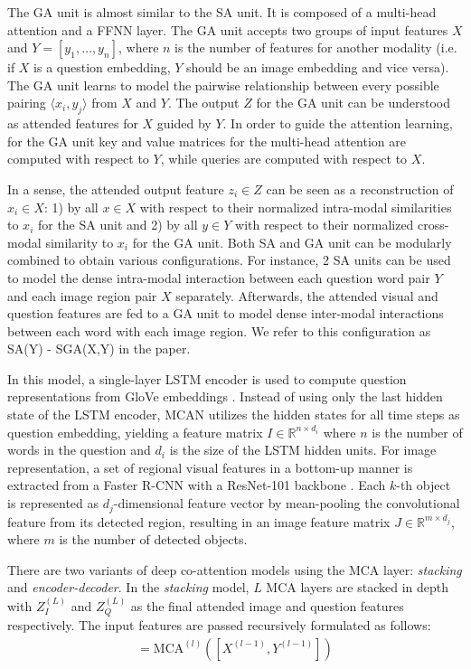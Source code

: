 \documentclass{article}
\begin{document}
The GA unit is almost similar to the SA unit. It is composed of a multi-head attention and a FFNN layer. The GA unit accepts two groups of input features $X$ and $Y = [y_{1}, \dots, y_{n}]$, where $n$ is the number of features for another modality (i.e. if $X$ is a question embedding, $Y$ should be an image embedding and vice versa). The GA unit learns to model the pairwise relationship between every possible pairing $\langle x_{i},y_{j} \rangle$ from $X$ and $Y$. The output $Z$ for the GA unit can be understood as attended features for $X$ guided by $Y$. In order to guide the attention learning, for the GA unit key and value matrices for the multi-head attention are computed with respect to $Y$, while queries are computed with respect to $X$.

In a sense, the attended output feature $z_{i} \in Z$ can be seen as a reconstruction of $x_{i} \in X$: 1) by all $x \in X$ with respect to their normalized intra-modal similarities to $x_{i}$ for the SA unit and 2) by all $y \in Y$ with respect to their normalized cross-modal similarity to $x_{i}$ for the GA unit. Both SA and GA unit can be modularly combined to obtain various configurations. For instance, 2 SA units can be used to model the dense intra-modal interaction between each question word pair $Y$ and each image region pair $X$ separately. Afterwards, the attended visual and question features are fed to a GA unit to model dense inter-modal interactions between each word with each image region. We refer to this configuration as SA(Y) - SGA(X,Y) in the paper.

In this model, a single-layer LSTM encoder \citep{lstm} is used to compute question representations from GloVe embeddings \citep{pennington2014glove}. Instead of using only the last hidden state of the LSTM encoder, MCAN utilizes the hidden states for all time steps as question embedding, yielding a feature matrix $I \in \mathbb{R}^{n \times d_{i}}$ where $n$ is the number of words in the question and $d_{i}$ is the size of the LSTM hidden units. For image representation, a set of regional visual features in a bottom-up manner \citep{Anderson_2018_CVPR} is extracted from a Faster R-CNN \citep{faster_rcnn} with a ResNet-101 backbone \citep{residual}. Each $k$-th object is represented as $d_{j}$-dimensional feature vector by mean-pooling the convolutional feature from its detected region, resulting in an image feature matrix $J \in \mathbb{R}^{m \times d_{j}}$, where $m$ is the number of detected objects.

There are two variants of deep co-attention models using the MCA layer: \textit{stacking} and \textit{encoder-decoder}. In the \textit{stacking} model, $L$ MCA layers are stacked in depth with $Z_{I}^{(L)}$ and $Z_{Q}^{(L)}$ as the final attended image and question features respectively. The input features are passed recursively formulated as follows:
\begin{align}
    [X^{(l)}, Y^{(l)}] = \text{MCA}^{(l)}([X^{(l-1)}, Y^{(l-1)}])
\end{align}
\end{document}
